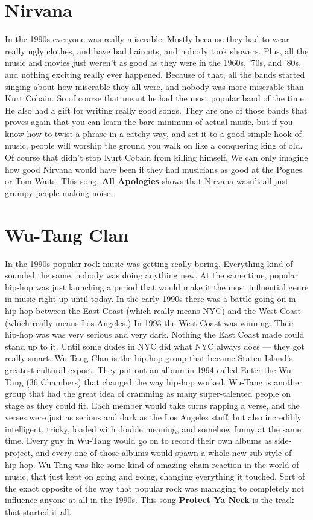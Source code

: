 \documentclass[letterpaper,single]{article}
\begin{document}
\section{Nirvana}
In the 1990s everyone was really miserable. 
Mostly because they had to wear really ugly clothes, and have bad haircuts, and nobody took showers. 
Plus, all the music and movies just weren't as good as they were in the 1960s, '70s, and '80s, and nothing exciting really ever happened. 
Because of that, all the bands started singing about how miserable they all were, and nobody was more miserable than Kurt Cobain. 
So of course that meant he had the most popular band of the time. 
He also had a gift for writing really good songs. 
They are one of those bands that proves again that you can learn the bare minimum of actual music, but if you know how to twist a phrase in a catchy way, and set it to a good simple hook of music, people will worship the ground you walk on like a conquering king of old. 
Of course that didn't stop Kurt Cobain from killing himself.
We can only imagine how good Nirvana would have been if they had musicians as good at the Pogues or Tom Waits.
This song, \textbf{All Apologies} shows that Nirvana wasn't all just grumpy people making noise.

\section{Wu-Tang Clan}
In the 1990s popular rock music was getting really boring. Everything kind of sounded the same, nobody was doing anything new.
At the same time, popular hip-hop was just launching a period that would make it the most influential genre in music right up until today.
In the early 1990s there was a battle going on in hip-hop between the East Coast (which really means NYC) and the West Coast (which really means Los Angeles.)
In 1993 the West Coast was winning. Their hip-hop was was very serious and very dark.
Nothing the East Coast made could stand up to it.
Until some dudes in NYC did what NYC always does --- they got really smart.
Wu-Tang Clan is the hip-hop group that became Staten Island's greatest cultural export.
They put out an album in 1994 called Enter the Wu-Tang (36 Chambers) that changed the way hip-hop worked.
Wu-Tang is another group that had the great idea of cramming as many super-talented people on stage as they could fit.
Each member would take turns rapping a verse, and the verses were just as serious and dark as the Los Angeles stuff, but also incredibly intelligent, tricky, loaded with double meaning, and somehow funny at the same time.
Every guy in Wu-Tang would go on to record their own albums as side-project, and every one of those albums would spawn a whole new sub-style of hip-hop.
Wu-Tang was like some kind of amazing chain reaction in the world of music, that just kept on going and going, changing everything it touched.
Sort of the exact opposite of the way that popular rock was managing to completely not influence anyone at all in the 1990s.
This song \textbf{Protect Ya Neck} is the track that started it all.
\end{document}
